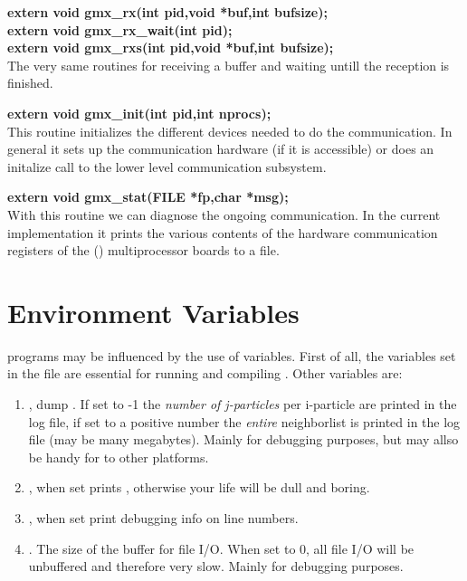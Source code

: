 \smallskip

{\bf extern void gmx\_rx(int pid,void *buf,int bufsize);}\\
{\bf extern void gmx\_rx\_wait(int pid);}\\
{\bf extern void gmx\_rxs(int pid,void *buf,int bufsize);}\\
The very same routines for receiving a buffer and waiting untill the reception is finished.

\smallskip

{\bf extern void gmx\_init(int pid,int nprocs);}\\
This routine initializes the different devices needed to do the communication. In general it sets up the communication hardware (if it is accessible) or does an initalize call to the lower level communication subsystem.

\smallskip

{\bf extern void gmx\_stat(FILE *fp,char *msg);}\\
With this routine we can diagnose the ongoing communication. In the current implementation it prints the various contents of the hardware communication  registers of the (\intel) multiprocessor boards to a file.


\section{Environment Variables}
{\gromacs} programs may be influenced by the use of  
variables. First of all, the variables set in the  file
are essential for running and compiling {\gromacs}. Other variables are:
\begin{enumerate}
\item	{}, dump . 
	If set to -1 the {\em number of j-particles} per i-particle are printed
	in the log file, if set to a positive number the {\em entire}
	neighborlist is printed in the log file (may be many megabytes).
	Mainly for debugging purposes, but may allso be handy for
	 to other platforms.
\item	{}, when set prints , otherwise
	your {\gromacs} life will be dull and boring.
\item	{}, when set print debugging info on line numbers.
\item	{}. The size of the buffer for file I/O. When set
	to 0, all file I/O will be unbuffered and therefore very slow.
	Mainly for debugging purposes.
\end{enumerate}

